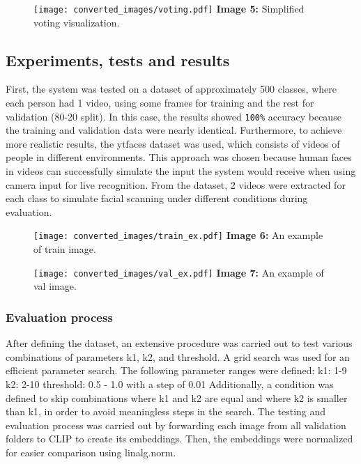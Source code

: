 \documentclass{article}
\begin{document}
\begin{figure}[H]
    \centering
    \texttt{[image: converted\_images/voting.pdf]}
    \textbf{Image 5:} Simplified voting visualization.
\end{figure}

\subsection*{Experiments, tests and results}
\hspace*{1.00cm} First, the system was tested on a dataset of approximately 500 classes, where each person had 1 video, using some frames for training and the rest for validation (80-20 split). In this case, the results showed \texttt{100\%} accuracy because the training and validation data were nearly identical. Furthermore, to achieve more realistic results, the ytfaces\cite{ytfaces} dataset was used, which consists of videos of people in different environments. This approach was chosen because human faces in videos can successfully simulate the input the system would receive when using camera input for live recognition. From the dataset, 2 videos were extracted for each class to simulate facial scanning under different conditions during evaluation.

\begin{figure}[H]
    \centering
    \texttt{[image: converted\_images/train\_ex.pdf]}
    \textbf{Image 6:} An example of train image.
\end{figure}
\begin{figure}[H]
    \centering
    \texttt{[image: converted\_images/val\_ex.pdf]}
    \textbf{Image 7:} An example of val image.
\end{figure}

\subsubsection*{Evaluation process}
\hspace*{1.00cm}After defining the dataset, an extensive procedure was carried out to test various combinations of parameters k1, k2, and threshold. A grid search\cite{pedregosa2011scikit} was used for an efficient parameter search. The following parameter ranges were defined:
k1: 1-9
k2: 2-10
threshold: 0.5 - 1.0 with a step of 0.01
Additionally, a condition was defined to skip combinations where k1 and k2 are equal and where k2 is smaller than k1, in order to avoid meaningless steps in the search.
The testing and evaluation process was carried out by forwarding each image from all validation folders to CLIP to create its embeddings. Then, the embeddings were normalized for easier comparison using linalg.norm\cite{numpy_norm}.
\end{document}
